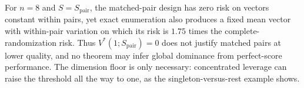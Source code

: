 For \(n=8\) and \(S=S_{\mathrm{pair}}\), the matched-pair design has zero risk on vectors constant within pairs, yet exact enumeration also produces a fixed mean vector with within-pair variation on which its risk is \(1.75\) times the complete-randomization risk. Thus \(V^*(1;S_{\mathrm{pair}})=0\) does not justify matched pairs at lower quality, and no theorem may infer global dominance from perfect-score performance. The dimension floor is only necessary: concentrated leverage can raise the threshold all the way to one, as the singleton-versus-rest example shows.